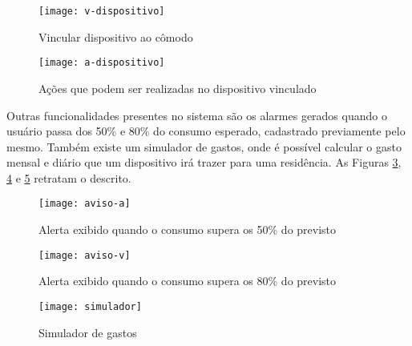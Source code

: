 \begin{figure}[h!]
	\texttt{[image: v-dispositivo]}
	\centering
	\caption[Vincular dispositivo ao cômodo]{Vincular dispositivo ao cômodo}
	\label{fig:v-dispositivo} 
\end{figure}
\FloatBarrier

\begin{figure}[h!]
	\texttt{[image: a-dispositivo]}
	\centering
	\caption[Ações que podem ser realizadas no dispositivo vinculado]{Ações que podem ser realizadas no dispositivo vinculado}
	\label{fig:a-dispositivo} 
\end{figure}
\FloatBarrier

Outras funcionalidades presentes no sistema são os alarmes gerados quando o usuário passa dos 50\% e 80\% do consumo esperado, cadastrado previamente pelo mesmo.
Também existe um simulador de gastos, onde é possível calcular o gasto mensal e diário que um dispositivo irá trazer para uma residência. As Figuras
\ref{fig:aviso-a}, \ref{fig:aviso-v} e \ref{fig:simulador} retratam o descrito.

\begin{figure}[h!]
	\texttt{[image: aviso-a]}
	\centering
	\caption[Alerta exibido quando o consumo supera os 50\% do previsto]{Alerta exibido quando o consumo supera os 50\% do previsto}
	\label{fig:aviso-a} 
\end{figure}
\FloatBarrier

\begin{figure}[h!]
	\texttt{[image: aviso-v]}
	\centering
	\caption[Alerta exibido quando o consumo supera os 80\% do previsto]{Alerta exibido quando o consumo supera os 80\% do previsto}
	\label{fig:aviso-v} 
\end{figure}
\FloatBarrier

\begin{figure}[h!]
	\texttt{[image: simulador]}
	\centering
	\caption[Simulador de gastos]{Simulador de gastos}
	\label{fig:simulador} 
\end{figure}
\FloatBarrier

